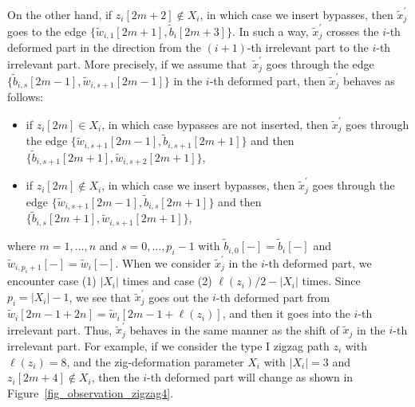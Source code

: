 \begin{observation}
On the other hand, if $z_i[2m+2]\not\in X_i$, in which case we insert bypasses, then $\widetilde{x}^\prime_j$ goes to the edge $\big\{\widetilde{w}_{i,1}[2m+1], \widetilde{b}_i[2m+3]\big\}$.
In such a way, $\widetilde{x}^\prime_j$ crosses the $i$-th deformed part in the direction from the $(i+1)$-th irrelevant part to the $i$-th irrelevant part.
More precisely, if we assume that~$\widetilde{x}^\prime_j$ goes through the edge $\{\widetilde{b}_{i,s}[2m-1], \widetilde{w}_{i,s+1}[2m-1]\}$ in the $i$-th deformed part,
then $\widetilde{x}^\prime_j$ behaves as follows:
\begin{itemize}\itemsep=0pt
\item[(1)] if $z_i[2m]\in X_i$, in which case bypasses are not inserted, then $\widetilde{x}^\prime_j$ goes through the edge $\big\{\widetilde{w}_{i,s+1}[2m-1],\widetilde{b}_{i,s+1}[2m+1]\big\}$ and then $\big\{\widetilde{b}_{i,s+1}[2m+1], \widetilde{w}_{i,s+2}[2m+1]\big\}$,
\item[(2)] if $z_i[2m]\not\in X_i$, in which case we insert bypasses, then $\widetilde{x}^\prime_j$ goes through the edge $\big\{\widetilde{w}_{i,s+1}[2m-1], \widetilde{b}_{i,s}[2m+1]\big\}$ and then $\big\{\widetilde{b}_{i,s}[2m+1], \widetilde{w}_{i,s+1}[2m+1]\big\}$,
\end{itemize}
where $m=1,\dots,n$ and $s=0,\dots,p_i-1$ with $\widetilde{b}_{i,0}[-]=\widetilde{b}_i[-]$ and $\widetilde{w}_{i,p_i+1}[-]=\widetilde{w}_i[-]$.
When we consider $\widetilde{x}^\prime_j$ in the $i$-th deformed part, we encounter case (1) $|X_i|$ times and case (2) $\ell(z_i)/2-|X_i|$ times.
Since $p_i=|X_i|-1$, we see that $\widetilde{x}^\prime_j$ goes out the $i$-th deformed part from $\widetilde{w}_i[2m-1+2n]=\widetilde{w}_i[2m-1+\ell(z_i)]$,
and then it goes into the $i$-th irrelevant part.
Thus, $\widetilde{x}^\prime_j$ behaves in the same manner as the shift of $\widetilde{x}_j$ in the $i$-th irrelevant part.
For example, if we consider the type I zigzag path $z_i$ with $\ell(z_i)=8$, and the zig-deformation parameter $X_i$ with $|X_i|=3$ and $z_i[2m+4]\not\in X_i$, then the $i$-th deformed part will change as shown in Figure~\ref{fig_observation_zigzag4}.

\begin{figure}[h!]\centering
{}
\end{figure}
\end{observation}
